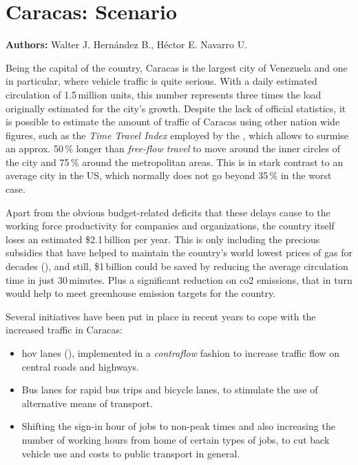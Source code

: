 \chapter{Caracas: Scenario}
\label{ch:caracas}
\hfill \textbf{Authors:} Walter J. Hernández B., Héctor E. Navarro U.

Being the capital of the country, Caracas is the largest city of Venezuela and one in particular, where vehicle traffic is quite serious. With a daily estimated circulation of 1.5\,million units, this number represents three times the load originally estimated for the city's growth. %
Despite the lack of official statistics, it is possible to estimate the amount of traffic of Caracas using other nation wide figures, such as the \emph{Time Travel Index} employed by the \citet{fhwa2013}, which allows to surmise an approx. 50\,\% longer than \textit{free-flow travel} to move around the inner circles of the city and 75\,\% around the metropolitan areas. This is in stark contrast to an average city in the US, which normally does not go beyond 35\,\% in the worst case.

Apart from the obvious budget-related deficits that these delays cause to the working force productivity for companies and organizations, the country itself loses an estimated \$2.1\,billion per year. This is only including the precious subsidies that have helped to maintain the country's world lowest prices of gas for decades (\citet{wilson2008}), and still, \$1\,billion could be saved by reducing the average circulation time in just 30\,minutes. Plus a significant reduction on \gls{co2} emissions, that in turn would help to meet greenhouse emission targets for the country.

Several initiatives have been put in place in recent years to cope with the increased traffic in Caracas:

\begin{itemize}\styleItemize
\item \gls{hov} lanes (\citet{turnbull1990}), implemented in a \textit{contraflow} fashion to increase traffic flow on central roads and highways.

\item Bus lanes for rapid bus trips and bicycle lanes, to stimulate the use of alternative means of transport.

\item Shifting the sign-in hour of jobs to non-peak times and also increasing the number of working hours from home of certain types of jobs, to cut back vehicle use and costs to public transport in general.
\end{itemize}

